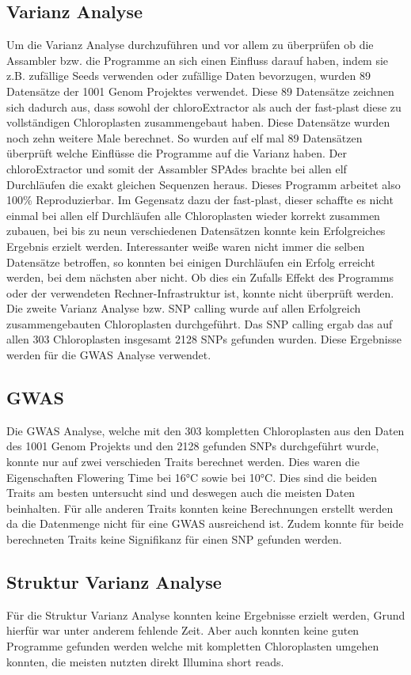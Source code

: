 \documentclass{scrartcl}
\begin{document}
\subsection{Varianz Analyse}
\label{sec-4-7}
Um die Varianz Analyse durchzuführen und vor allem zu überprüfen ob die Assambler bzw. die Programme an sich einen Einfluss darauf haben, indem sie z.B. zufällige Seeds verwenden oder zufällige Daten bevorzugen, wurden 89 Datensätze
der 1001 Genom Projektes verwendet. Diese 89 Datensätze zeichnen sich dadurch aus, dass sowohl der chloroExtractor als auch der fast-plast diese zu vollständigen Chloroplasten zusammengebaut haben. Diese Datensätze
wurden noch zehn weitere Male berechnet. So wurden auf elf mal 89 Datensätzen überprüft welche Einflüsse die Programme auf die Varianz haben. Der chloroExtractor und somit der Assambler SPAdes brachte bei allen elf
Durchläufen die exakt gleichen Sequenzen heraus. Dieses Programm arbeitet also 100\% Reproduzierbar. Im Gegensatz dazu der fast-plast, dieser schaffte es nicht einmal bei allen elf Durchläufen alle Chloroplasten wieder
korrekt zusammen zubauen, bei bis zu neun verschiedenen Datensätzen konnte kein Erfolgreiches Ergebnis erzielt werden. Interessanter weiße waren nicht immer die selben Datensätze betroffen, so konnten bei einigen Durchläufen
ein Erfolg erreicht werden, bei dem nächsten aber nicht. Ob dies ein Zufalls Effekt des Programms oder der verwendeten Rechner-Infrastruktur ist, konnte nicht überprüft werden.
Die zweite Varianz Analyse bzw. SNP calling wurde auf allen Erfolgreich zusammengebauten Chloroplasten durchgeführt. Das SNP calling ergab das auf allen 303 Chloroplasten insgesamt 2128 SNPs gefunden wurden. 
Diese Ergebnisse werden für die GWAS Analyse verwendet.
\subsection{GWAS}
\label{sec-4-8}
Die GWAS Analyse, welche mit den 303 kompletten Chloroplasten aus den Daten des 1001 Genom Projekts und den 2128 gefunden SNPs durchgeführt wurde, konnte nur auf zwei verschieden Traits berechnet werden. Dies waren 
die Eigenschaften Flowering Time bei 16°C sowie bei 10°C. Dies sind die beiden Traits am besten untersucht sind und deswegen auch die meisten Daten beinhalten. Für alle anderen Traits konnten
keine Berechnungen erstellt werden da die Datenmenge nicht für eine GWAS ausreichend ist. Zudem konnte für beide berechneten Traits keine Signifikanz für einen SNP gefunden werden.
\subsection{Struktur Varianz Analyse}
\label{sec-4-9}
Für die Struktur Varianz Analyse konnten keine Ergebnisse erzielt werden, Grund hierfür war unter anderem fehlende Zeit. Aber auch konnten keine guten Programme gefunden werden welche mit kompletten Chloroplasten
umgehen konnten, die meisten nutzten direkt Illumina short reads. 
\end{document}
